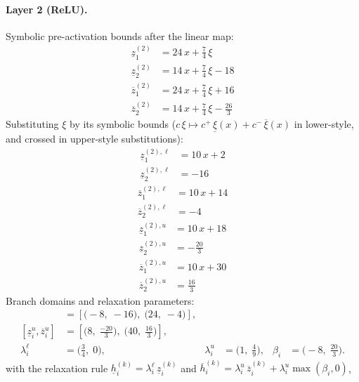 \documentclass[11pt]{article}
\begin{document}
\paragraph{Layer 2 (ReLU).}
Symbolic pre-activation bounds after the linear map:
\begin{align*}
\underline{z}^{(2)}_{1} &= 24\,x + \frac{7}{4}\,\xi \\
\underline{z}^{(2)}_{2} &= 14\,x + \frac{7}{4}\,\xi - 18
\end{align*}
\begin{align*}
\overline{z}^{(2)}_{1} &= 24\,x + \frac{7}{4}\,\xi + 16 \\
\overline{z}^{(2)}_{2} &= 14\,x + \frac{7}{4}\,\xi - \frac{26}{3}
\end{align*}
Substituting $\xi$ by its symbolic bounds ($c\,\xi \mapsto c^{+}\,\underline{\xi}(x) + c^{-}\,\overline{\xi}(x)$ in lower-style, and crossed in upper-style substitutions):
\begin{align*}
\underline{z}^{(2),\ell}_{1} &= 10\,x + 2 \\
\underline{z}^{(2),\ell}_{2} &= -16
\end{align*}
\begin{align*}
\overline{z}^{(2),\ell}_{1} &= 10\,x + 14 \\
\overline{z}^{(2),\ell}_{2} &= -4
\end{align*}
\begin{align*}
\underline{z}^{(2),u}_{1} &= 10\,x + 18 \\
\underline{z}^{(2),u}_{2} &= -\frac{20}{3}
\end{align*}
\begin{align*}
\overline{z}^{(2),u}_{1} &= 10\,x + 30 \\
\overline{z}^{(2),u}_{2} &= \frac{16}{3}
\end{align*}
Branch domains and relaxation parameters:
\begin{align*}
[\underline{z}^{\ell}_i, \overline{z}^{\ell}_i] &= [\bigl(-8,\; -16\bigr),\; \bigl(24,\; -4\bigr)], \\ 
[\underline{z}^{u}_i, \overline{z}^{u}_i] &= [\bigl(8,\; \frac{-20}{3}\bigr),\; \bigl(40,\; \frac{16}{3}\bigr)], \\
\lambda^{\ell}_i &= \bigl(\frac{3}{4},\; 0\bigr), & \lambda^{u}_i &= \bigl(1,\; \frac{4}{9}\bigr), & \beta_i &= \bigl(-8,\; \frac{20}{3}\bigr).
\end{align*}
with the relaxation rule
$\underline{h}^{(k)}_i = \lambda^{\ell}_i\, \underline{z}^{(k)}_i$ and
$\overline{h}^{(k)}_i = \lambda^{u}_i\, \overline{z}^{(k)}_i + \lambda^{u}_i \max(\beta_i, 0)$,
\end{document}
